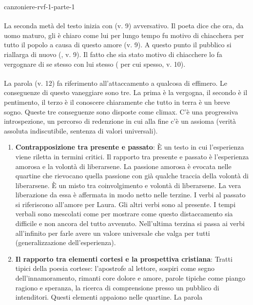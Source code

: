 \documentclass[preview]{standalone}
\begin{document}
\begin{snippet}{canzoniere-rvf-1-parte-1}
    \\\\
    La seconda metà del testo inizia con  (v. 9) avversativo.
    Il poeta dice che ora, da uomo maturo, gli è chiaro come lui per lungo tempo fu motivo
    di chiacchera per tutto il popolo a causa di questo amore (v. 9).
    A questo punto il pubblico si riallarga di nuovo (, v. 9).
    Il fatto che sia stato motivo di chiacchere lo fa vergognare di se stesso con lui stesso
    ( \textrightarrow per cui spesso, v. 10).
    \\\\
    La parola  (v. 12) fa riferimento all'attaccamento a qualcosa di effimero.
    Le conseguenze di questo vaneggiare sono tre.
    La prima è la vergogna, il secondo è il pentimento, il terzo è il conoscere chiaramente che tutto in
    terra è un breve sogno. Queste tre conseguenze sono disposte come climax. C'è una progressiva
    introspezione, un percorso di redenzione in cui alla fine c'è un assioma (verità assoluta indiscutibile,
    sentenza di valori universali).
    \begin{enumerate}
        \item \textbf{Contrapposizione tra presente e passato}:
            È un testo in cui l'esperienza viene riletta in termini critici. Il rapporto tra presente e passato è
            l'esperienza amorosa e la volontà di liberarsene. La passione amorosa è evocata nelle quartine che
            rievocano quella passione con già qualche traccia della volontà di liberarsene. È un misto tra
            coinvolgimento e volontà di liberarsene. La vera liberazione da essa è affermata in modo netto nelle
            terzine. I verbi al passato si riferiscono all'amore per Laura. Gli altri verbi sono al presente. I tempi
            verbali sono mescolati come per mostrare come questo distaccamento sia difficile e non ancora del
            tutto avvenuto. Nell'ultima terzina si passa ai verbi all'infinito per farle avere un valore universale
            che valga per tutti (generalizzazione dell'esperienza).
        \item \textbf{Il rapporto tra elementi cortesi e la prospettiva cristiana}:
            Tratti tipici della poesia cortese: l'apostrofe al lettore, sospiri come segno dell'innamoramento,
            rimanti core dolore e amore, parole tipiche come piango ragiono e speranza, la ricerca di
            comprensione presso un pubblico di intenditori. Questi elementi appaiono nelle quartine. La parola

\end{enumerate}
\end{snippet}
\end{document}
